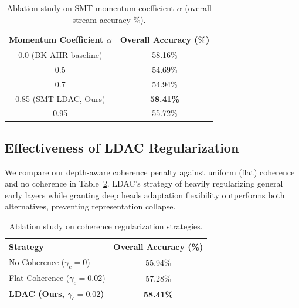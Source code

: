 \documentclass{article}
\theoremstyle{plain}
\theoremstyle{definition}
\theoremstyle{remark}
\begin{document}
\begin{table}[h]
\caption{Ablation study on SMT momentum coefficient $\alpha$ (overall stream accuracy \%).}
\label{tab:ablation_alpha}
\vskip 0.1in
\begin{center}
\begin{small}
\begin{tabular}{cc}
\toprule
\textbf{Momentum Coefficient $\alpha$} & \textbf{Overall Accuracy (\%)} \\
\midrule
0.0 (BK-AHR baseline) & 58.16\% \\
0.5 & 54.69\% \\
0.7 & 54.94\% \\
0.85 (SMT-LDAC, Ours) & \textbf{58.41\%} \\
0.95 & 55.72\% \\
\bottomrule
\end{tabular}
\end{small}
\end{center}
\end{table}

\subsection{Effectiveness of LDAC Regularization}
We compare our depth-aware coherence penalty against uniform (flat) coherence and no coherence in Table~\ref{tab:ablation_coherence}. LDAC's strategy of heavily regularizing general early layers while granting deep heads adaptation flexibility outperforms both alternatives, preventing representation collapse.

\begin{table}[h]
\caption{Ablation study on coherence regularization strategies.}
\label{tab:ablation_coherence}
\vskip 0.1in
\begin{center}
\begin{small}
\begin{tabular}{lc}
\toprule
\textbf{Strategy} & \textbf{Overall Accuracy (\%)} \\
\midrule
No Coherence ($\gamma_c = 0$) & 55.94\% \\
Flat Coherence ($\gamma_c = 0.02$) & 57.28\% \\
\textbf{LDAC (Ours, $\gamma_c = 0.02$)} & \textbf{58.41\%} \\
\bottomrule
\end{tabular}
\end{small}
\end{center}
\end{table}
\end{document}

